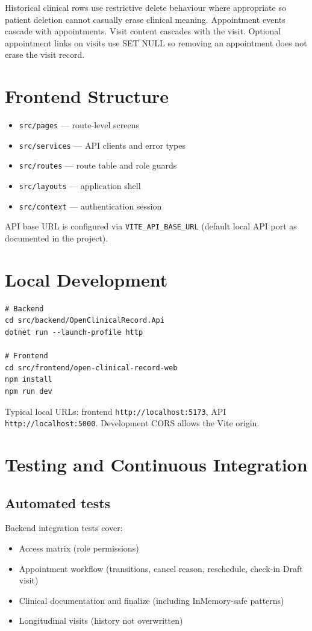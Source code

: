 \documentclass[11pt,a4paper]{article}
\begin{document}
Historical clinical rows use restrictive delete behaviour where appropriate so patient deletion cannot casually erase clinical meaning. Appointment events cascade with appointments. Visit content cascades with the visit. Optional appointment links on visits use SET NULL so removing an appointment does not erase the visit record.

\section{Frontend Structure}
\begin{itemize}
  \item \texttt{src/pages} --- route-level screens
  \item \texttt{src/services} --- API clients and error types
  \item \texttt{src/routes} --- route table and role guards
  \item \texttt{src/layouts} --- application shell
  \item \texttt{src/context} --- authentication session
\end{itemize}
API base URL is configured via \texttt{VITE\_API\_BASE\_URL} (default local API port as documented in the project).

\section{Local Development}

\begin{lstlisting}
# Backend
cd src/backend/OpenClinicalRecord.Api
dotnet run --launch-profile http

# Frontend
cd src/frontend/open-clinical-record-web
npm install
npm run dev
\end{lstlisting}

Typical local URLs: frontend \texttt{http://localhost:5173}, API \texttt{http://localhost:5000}. Development CORS allows the Vite origin.

\section{Testing and Continuous Integration}

\subsection{Automated tests}
Backend integration tests cover:
\begin{itemize}
  \item Access matrix (role permissions)
  \item Appointment workflow (transitions, cancel reason, reschedule, check-in Draft visit)
  \item Clinical documentation and finalize (including InMemory-safe patterns)
  \item Longitudinal visits (history not overwritten)
\end{itemize}
\end{document}
